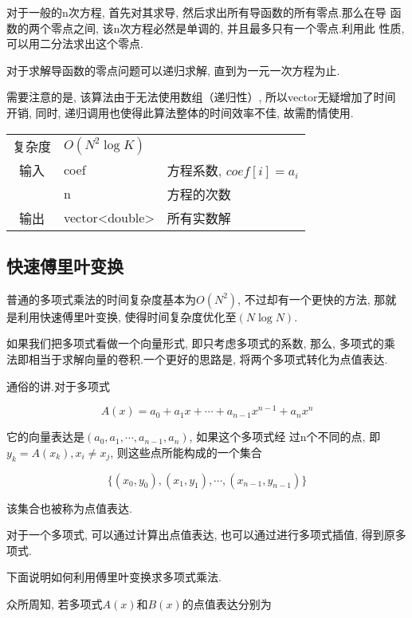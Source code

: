 对于一般的n次方程, 首先对其求导, 然后求出所有导函数的所有零点.那么在导
函数的两个零点之间, 该n次方程必然是单调的, 并且最多只有一个零点.利用此
性质, 可以用二分法求出这个零点.

对于求解导函数的零点问题可以递归求解, 直到为一元一次方程为止.

需要注意的是, 该算法由于无法使用数组（递归性）, 所以vector无疑增加了时间
开销, 同时, 递归调用也使得此算法整体的时间效率不佳, 故需酌情使用.

\begin{longtable}{|c|l|l|}
复杂度 & $O(N^{2}\log K)$ &  \\
输入 & coef & 方程系数, $coef[i] = a_{i}$ \\
 & n & 方程的次数 \\
输出 & vector<double> & 所有实数解 \\ 
\end{longtable}



    \subsection{快速傅里叶变换}\small
普通的多项式乘法的时间复杂度基本为$O(N^2)$, 不过却有一个更快的方法, 那就
是利用快速傅里叶变换, 使得时间复杂度优化至$(N\log N)$.

如果我们把多项式看做一个向量形式, 即只考虑多项式的系数, 那么, 多项式的乘
法即相当于求解向量的卷积.一个更好的思路是, 将两个多项式转化为点值表达.

通俗的讲.对于多项式

\begin{equation}
A(x) = a_{0} + a_{1}x + \cdots + a_{n-1}x^{n-1} + a_{n}x^{n}
\end{equation}

它的向量表达是$(a_{0},  a_{1}, \cdots , a_{n-1}, a_{n})$, 如果这个多项式经
过n个不同的点, 即$y_k = A(x_k), x_i \neq x_j$, 则这些点所能构成的一个集合

\begin{equation}
\{(x_0, y_0), (x_1, y_1), \cdots , (x_{n - 1}, y_{n - 1})\}
\end{equation}

该集合也被称为点值表达.

对于一个多项式, 可以通过计算出点值表达, 也可以通过进行多项式插值, 得到原多项式.

下面说明如何利用傅里叶变换求多项式乘法.

众所周知, 若多项式$A(x)$和$B(x)$的点值表达分别为

